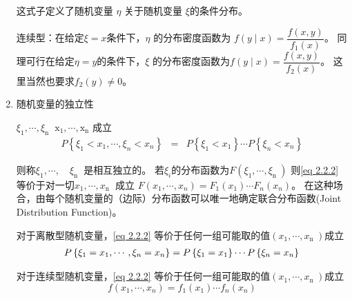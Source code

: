 \begin{enumerate}[1、]
	      这式子定义了随机变量 $ \eta $ 关于随机变量 $ \xi $的条件分布。
	      
	      连续型：在给定$ \xi = x $条件下，$ \eta $ 的分布密度函数为 $ f(y \mid x)=\dfrac{f(x, y)}{f_{1}(x)}  $。
	      同理可行在给定$ \eta = y $的条件下，$ \xi  $ 的分布密度函数为$ f(y \mid x)=\dfrac{f(x, y)}{f_{2}(x)}  $。
	      这里当然也要求$ f_{2}(y) \neq 0 $。
    
     \item 随机变量的独立性
     \setlength{\parindent}{2\ccwd}
     
     	\begin{mydef}
		 	  $ \xi_{1}, \cdots,  \xi_{\text {n }} $   $ \mathrm{x}_{1}, \cdots, \mathrm{x}_{\mathrm{n}} \text { 成立 } $
			\vspace{-0.6em}
			\begin{eqnarray}
			P\left\{\xi_{1}<x_{1}, \cdots, \xi_{n}<x_{n}\right\} & = & P\left\{\xi_{1}<x_{1}\right\} \cdots P\left\{\xi_{n}<x_{n}\right\} \label{eq 2.2.2}
			\end{eqnarray}
			
			则称$ \xi_{1}, \cdots, \quad \xi_{\text {n }} $ 是相互独立的。
			若$ \xi_{i} $的分布函数为$ F\left( \xi_{1}, \cdots,  \xi_{\text {n }} \right) $
			则\eqref{eq 2.2.2}等价于对一切$ x_{1}, \cdots,  x_{\text {n }} $ 成立
			$ F\left(x_{1}, \cdots, x_{n}\right)=F_{1}\left(x_{1}\right) \cdots F_{n}\left(x_{n}\right) $。
			在这种场合，由每个随机变量的（边际）分布函数可以唯一地确定联合分布函数(Joint Distribution Function)。
		\end{mydef}

     	对于离散型随机变量，\eqref{eq 2.2.2} 等价于任何一组可能取的值$ \left( x_{1}, \cdots,  x_{\text {n }} \right) $成立
     	\vspace{-0.5em}
     	\begin{eqnarray}
     	\begin{array}{c}
     	P\left\{\xi_{1} = x_{1}, \cdots, \xi_{n} = x_{n}\right\} = P\left\{\xi_{1} = x_{1}\right\} \cdots P\left\{\xi_{n} = x_{n}\right\}
     	\end{array} \notag 
     	\end{eqnarray}
     	
     	对于连续型随机变量，\eqref{eq 2.2.2} 等价于任何一组可能取的值$ \left( x_{1}, \cdots,  x_{\text {n }} \right) $成立
     	\vspace{-1em}
     	$$  f\left(x_{1}, \cdots, x_{n}\right)=f_{1}\left(x_{1}\right) \cdots f_{n}\left(x_{n}\right) $$
     	

\end{enumerate}
